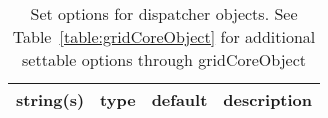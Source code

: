 \begin{table}[ht]
\centering
\begin{tabular}{p{5cm} c c p{7cm}}
\hline
string(s) & type & default & description \\
\hline
\hline
\end{tabular}
\caption{Set options for dispatcher objects. See Table~\ref{table:gridCoreObject} for additional settable options through gridCoreObject}
\label{table:dispatcher}
\end{table}

